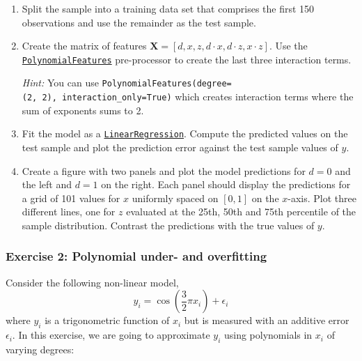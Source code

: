 \documentclass{scrartcl}
\begin{document}
\begin{enumerate}
\def\labelenumi{\arabic{enumi}.}
\item
  Split the sample into a training data set that comprises the first 150
  observations and use the remainder as the test sample.
\item
  Create the matrix of features
  \(\mathbf{X} = [d, x, z, d\cdot x, d\cdot z, x\cdot z]\). Use the
  \href{https://scikit-learn.org/stable/modules/generated/sklearn.preprocessing.PolynomialFeatures.html}{\texttt{PolynomialFeatures}}
  pre-processor to create the last three interaction terms.

  \emph{Hint:} You can use
  \texttt{PolynomialFeatures(degree=(2,\ 2),\ interaction\_only=True)}
  which creates interaction terms where the sum of exponents sums to 2.
\item
  Fit the model as a
  \href{https://scikit-learn.org/stable/modules/generated/sklearn.linear_model.LinearRegression.html}{\texttt{LinearRegression}}.
  Compute the predicted values on the test sample and plot the
  prediction error against the test sample values of \(y\).
\item
  Create a figure with two panels and plot the model predictions for
  \(d=0\) and the left and \(d=1\) on the right. Each panel should
  display the predictions for a grid of 101 values for \(x\) uniformly
  spaced on \([0, 1]\) on the \(x\)-axis. Plot three different lines,
  one for \(z\) evaluated at the 25th, 50th and 75th percentile of the
  sample distribution. Contrast the predictions with the true values of
  \(y\).
\end{enumerate}

    \hypertarget{exercise-2-polynomial-under--and-overfitting}{%
\subsubsection*{Exercise 2: Polynomial under- and
overfitting}\label{exercise-2-polynomial-under--and-overfitting}}

Consider the following non-linear model, \[
y_i = \cos\left(\frac{3}{2} \pi x_i \right) + \epsilon_i
\] where \(y_i\) is a trigonometric function of \(x_i\) but is measured
with an additive error \(\epsilon_i\). In this exercise, we are going to
approximate \(y_i\) using polynomials in \(x_i\) of varying degrees:
\end{document}
